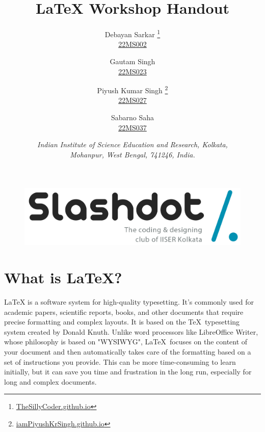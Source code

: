 \documentclass[12pt, a4paper]{article}
\title{\Huge \LaTeX{} Workshop Handout}
\author{\large
    Debayan Sarkar
        \thanks{{\href{https://thesillycoder.github.io}{TheSillyCoder.github.io}}}
        \\\href{mailto:ds22ms002@iiserkol.ac.in}{22MS002} \and
    Gautam Singh
        \\\href{mailto:gs22ms023@iiserkol.ac.in}{22MS023} \and
    Piyush Kumar Singh
        \thanks{{\href{https://iampiyushkrsingh.github.io}{iamPiyushKrSingh.github.io}}}
        \\\href{mailto:pks22ms027@iiserkol.ac.in}{22MS027} \and
    Sabarno Saha
        \\\href{mailto:ss22ms037@iiserkol.ac.in}{22MS037}
}
\date{
    \normalsize
    \textit{Indian Institute of Science Education and Research, Kolkata, \\
        Mohanpur, West Bengal, 741246, India.}
}
\begin{document}
\large

\begin{titlepage}

\begin{figure}
\centering
\includegraphics[width = \textwidth]{banner-w.png}
\end{figure}

\vspace{10ex}

\maketitle

\end{titlepage}

\tableofcontents
\pagebreak
\section{What is \textrm{\LaTeX}?}

\LaTeX{} is a software system for high-quality typesetting. It's commonly used for academic papers, scientific reports, books, and other documents that require precise formatting and complex layouts. It is based on the \TeX\ typesetting system created by Donald Knuth. Unlike word processors like LibreOffice Writer, whose philosophy is based on "WYSIWYG", \LaTeX\ focuses on the content of your document and then automatically takes care of the formatting based on a set of instructions you provide. This can be more time-consuming to learn initially, but it can save you time and frustration in the long run, especially for long and complex documents.
\end{document}
